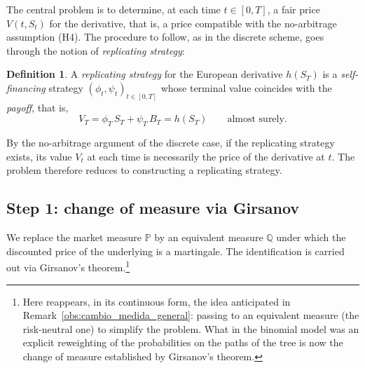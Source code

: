 \documentclass[11pt,a4paper,oneside]{report}
\theoremstyle{plain}
\theoremstyle{definition}
\newtheorem{definicion}[teorema]{Definition}
\theoremstyle{remark}
\newcommand{\PP}{\mathbb{P}}
\newcommand{\Q}{\mathbb{Q}}
\newcommand{\1}{\mathbf{1}}
\begin{document}
The central problem is to
determine, at each time $t \in [0, T]$, a fair price $V(t, S_t)$ for
the derivative, that is, a price compatible with the no-arbitrage
assumption (H4). The procedure to follow, as in the discrete scheme,
goes through the notion of \emph{replicating strategy}:

\begin{definicion}
\label{def:estrategia_replicante}
A \emph{replicating strategy} for the European derivative $h(S_T)$ is
a \emph{self-financing} strategy $(\phi_t, \psi_t)_{t \in [0, T]}$
whose terminal value coincides with the \emph{payoff}, that is,
\begin{equation*}
  V_T = \phi_T\, S_T + \psi_T\, B_T = h(S_T)
  \qquad \text{almost surely}.
\end{equation*}
\end{definicion}

By the no-arbitrage argument of the discrete case, if the replicating
strategy exists, its value $V_t$ at each time is necessarily the
price of the derivative at $t$. The problem therefore reduces to
constructing a replicating strategy.

\subsection{Step 1: change of measure via Girsanov}
\label{subsec:paso1_girsanov}

We replace the market measure $\PP$ by an equivalent measure $\Q$
under which the discounted price of the underlying is a martingale.
The identification is carried out via Girsanov's
theorem.\footnote{Here reappears, in its continuous form, the idea
anticipated in Remark~\ref{obs:cambio_medida_general}: passing to an
equivalent measure (the risk-neutral one) to simplify the problem.
What in the binomial model was an explicit reweighting of the
probabilities on the paths of the tree is now the change of measure
established by Girsanov's theorem.}
\end{document}
